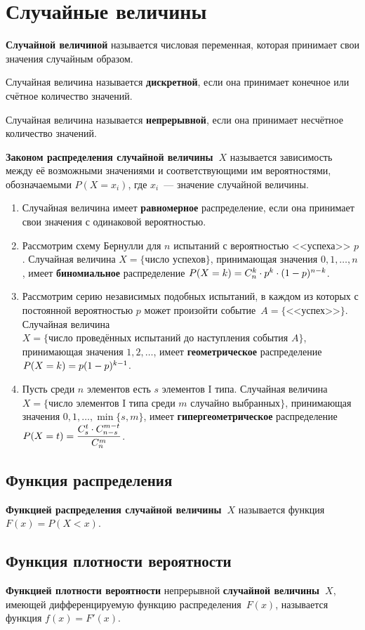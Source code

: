 \section{Случайные величины}
 \textbf{Случайной величиной} называется числовая переменная, которая принимает свои значения случайным образом.

Случайная величина называется \textbf{дискретной}, если она принимает конечное или счётное количество значений.

Случайная величина называется \textbf{непрерывной}, если она принимает несчётное количество значений.

\textbf{Законом распределения случайной величины~$X$} называется зависимость между её возможными значениями и соответствующими им вероятностями, обозначаемыми $P(X = x_i)$, где $x_i$~--- значение случайной величины.
\begin{enumerate}
	\item Случайная величина имеет \textbf{равномерное} распределение, если она принимает свои значения с одинаковой вероятностью.
	
	\item Рассмотрим схему Бернулли для $n$ испытаний с вероятностью <<успеха>> $p$.
	Случайная величина $X = \{ \text{число } \allowbreak \text{успехов} \}$, принимающая значения $0, 1, \ldots, n$, имеет \textbf{биномиальное} распределение $P(X = k) = C_n^k \opbr\cdot p^k \opbr\cdot (1 \opbr- p)^{n-k}$.
	
	\item Рассмотрим серию независимых подобных испытаний, в каждом из которых с постоянной вероятностью $p$ может произойти событие~$A = \{ \text{<<успех>>} \}$.
	Случайная величина $X = \{ \text{число проведённых испытаний до } \allowbreak \text{наступления события } A \}$, принимающая значения $1, 2, \ldots$, имеет \textbf{геометрическое} распределение $P(X = k) \opbr= p (1 - p)^{k-1}$.
	
	\item Пусть среди $n$ элементов есть $s$ элементов I типа.
	Случайная величина $X = \{ \text{число элементов I типа среди } m \allowbreak \text{ случайно выбранных} \}$, принимающая значения $0, 1, \ldots, \min \{ s, m \}$, имеет \textbf{гипергеометрическое} распределение $P(X = t) \opbr= \dfrac{C_s^t \cdot C_{n-s}^{m-t}}{C_n^m}$.
\end{enumerate}

\subsection{Функция распределения}
 \textbf{Функцией распределения случайной величины~$X$} называется функция $F(x) = P(X < x)$.

\subsection{Функция плотности вероятности}
 \textbf{Функцией плотности вероятности} непрерывной \textbf{случайной величины~$X$}, имеющей дифференцируемую функцию распределения~$F(x)$, называется функция $f(x) = F'(x)$.